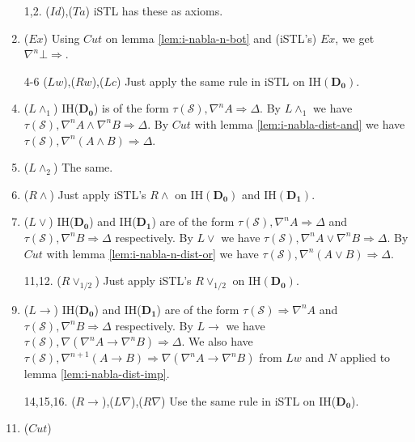 \begin{enumerate}
	\item[1,2.] ($Id$),($Ta$) iSTL has these as axioms.
	\setcounter{enumi}{2}

	\item ($Ex$) Using $Cut$ on lemma \ref{lem:i-nabla-n-bot} and (iSTL's) $Ex$, we get $\nabla^n \bot \Rightarrow$.

	\item[4-6] ($Lw$),($Rw$),($Lc$) Just apply the same rule in iSTL on IH$(\mathbf{D_0})$.
	\setcounter{enumi}{6}

	\item ($L\land_1$) IH($\mathbf{D_0}$) is of the form $\tau(\mathcal{S}) , \nabla^n A \Rightarrow \Delta$. By $L\land_1$ we have $\tau(\mathcal{S}) , \nabla^n A \land \nabla^n B \Rightarrow \Delta$. By $Cut$ with lemma \ref{lem:i-nabla-dist-and} we have $\tau(\mathcal{S}) , \nabla^n (A \land B) \Rightarrow \Delta$.
	
	\item ($L\land_2$) The same.
	
	\item ($R\land$) Just apply iSTL's $R\land$ on IH$(\mathbf{D_0})$ and IH$(\mathbf{D_1})$.
	
	\item ($L\lor$) IH($\mathbf{D_0}$) and IH($\mathbf{D_1}$) are of the form $\tau(\mathcal{S}) , \nabla^n A \Rightarrow \Delta$ and $\tau(\mathcal{S}) , \nabla^n B \Rightarrow \Delta$ respectively. By $L\lor$ we have $\tau(\mathcal{S}) , \nabla^n A \lor \nabla^n B \Rightarrow \Delta$. By $Cut$ with lemma \ref{lem:i-nabla-n-dist-or} we have $\tau(\mathcal{S}) , \nabla^n (A \lor B) \Rightarrow \Delta$.
	
	\item[11,12.] ($R\lor_{1/2}$) Just apply iSTL's $R\lor_{1/2}$ on IH$(\mathbf{D_0})$.
	\setcounter{enumi}{12}
	
	\item ($L\rightarrow$) IH($\mathbf{D_0}$) and IH($\mathbf{D_1}$) are of the form $\tau(\mathcal{S}) \Rightarrow \nabla^n A$ and $\tau(\mathcal{S}) , \nabla^n B \Rightarrow \Delta$ respectively. By $L\rightarrow$ we have $\tau(\mathcal{S}) , \nabla (\nabla^n A \rightarrow \nabla^n B) \Rightarrow \Delta$. We also have $\tau(\mathcal{S}) , \nabla^{n+1} (A \rightarrow B) \Rightarrow \nabla (\nabla^n A \rightarrow \nabla^n B)$ from $Lw$ and $N$ applied to lemma \ref{lem:i-nabla-dist-imp}.
	
	\item[14,15,16.] ($R\rightarrow$),($L\nabla$),($R\nabla$) Use the same rule in iSTL on IH($\mathbf{D_0}$).
	\setcounter{enumi}{16}
	
	\item ($Cut$) \todo{}
\end{enumerate}
